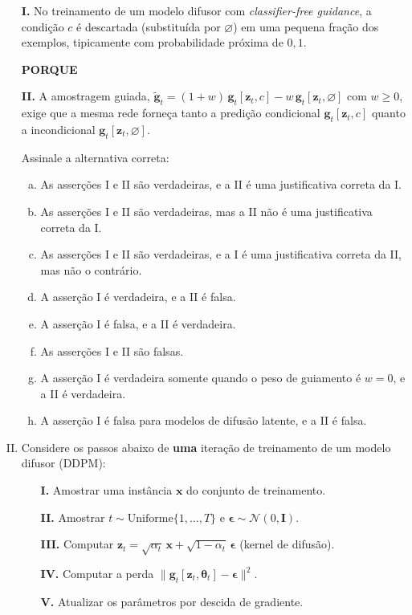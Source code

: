 \documentclass{dlproblemset}
\newcommand{\thetav}{\boldsymbol{\theta}}
\begin{document}
\begin{enumerate}[I)]
\textbf{I.} No treinamento de um modelo difusor com \textit{classifier-free guidance}, a condição $c$ é descartada (substituída por $\varnothing$) em uma pequena fração dos exemplos, tipicamente com probabilidade próxima de $0{,}1$.

\begin{center}\textbf{PORQUE}\end{center}

\textbf{II.} A amostragem guiada, $\tilde{\mathbf{g}}_t = (1+w)\,\mathbf{g}_t[\mathbf{z}_t, c] - w\,\mathbf{g}_t[\mathbf{z}_t, \varnothing]$ com $w \geq 0$, exige que a mesma rede forneça tanto a predição condicional $\mathbf{g}_t[\mathbf{z}_t, c]$ quanto a incondicional $\mathbf{g}_t[\mathbf{z}_t, \varnothing]$.

Assinale a alternativa correta:
\begin{enumerate}[(a)]
    \item As asserções I e II são verdadeiras, e a II é uma justificativa correta da I.
    \item As asserções I e II são verdadeiras, mas a II não é uma justificativa correta da I.
    \item As asserções I e II são verdadeiras, e a I é uma justificativa correta da II, mas não o contrário.
    \item A asserção I é verdadeira, e a II é falsa.
    \item A asserção I é falsa, e a II é verdadeira.
    \item As asserções I e II são falsas.
    \item A asserção I é verdadeira somente quando o peso de guiamento é $w = 0$, e a II é verdadeira.
    \item A asserção I é falsa para modelos de difusão latente, e a II é falsa.
\end{enumerate}

\item Considere os passos abaixo de \textbf{uma} iteração de treinamento de um modelo difusor (DDPM):

\begin{itemize}
    \item[\textbf{I.}] Amostrar uma instância $\mathbf{x}$ do conjunto de treinamento.
    \item[\textbf{II.}] Amostrar $t \sim \mathrm{Uniforme}\{1, \dots, T\}$ e $\boldsymbol{\epsilon} \sim \mathcal{N}(0, \mathbf{I})$.
    \item[\textbf{III.}] Computar $\mathbf{z}_t = \sqrt{\alpha_t}\,\mathbf{x} + \sqrt{1 - \alpha_t}\,\boldsymbol{\epsilon}$ (kernel de difusão).
    \item[\textbf{IV.}] Computar a perda $\lVert \mathbf{g}_t[\mathbf{z}_t, \thetav_t] - \boldsymbol{\epsilon}\rVert^{2}$.
    \item[\textbf{V.}] Atualizar os parâmetros por descida de gradiente.
\end{itemize}


\end{enumerate}
\end{document}
